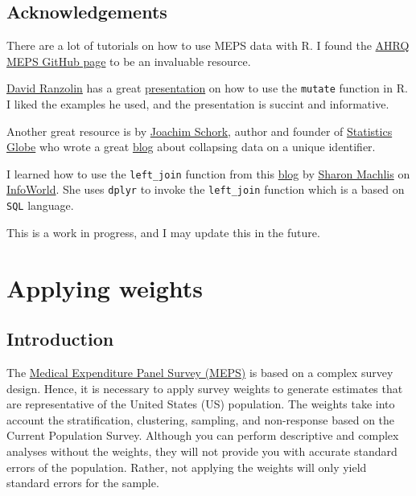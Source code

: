 \documentclass[
]{book}
\begin{document}
\hypertarget{acknowledgements-1}{%
\section{Acknowledgements}\label{acknowledgements-1}}

There are a lot of tutorials on how to use MEPS data with R. I found the \href{https://github.com/HHS-AHRQ/MEPS}{AHRQ MEPS GitHub page} to be an invaluable resource.

\href{https://daranzolin.github.io/}{David Ranzolin} has a great \href{https://rstudio-pubs-static.s3.amazonaws.com/116317_e6922e81e72e4e3f83995485ce686c14.html\#/2}{presentation} on how to use the \texttt{mutate} function in R. I liked the examples he used, and the presentation is succint and informative.

Another great resource is by \href{https://statisticsglobe.com/joachim-schork/}{Joachim Schork}, author and founder of \href{https://statisticsglobe.com/}{Statistics Globe} who wrote a great \href{https://statisticsglobe.com/sum-duplicate-rows-r}{blog} about collapsing data on a unique identifier.

I learned how to use the \texttt{left\_join} function from this \href{https://www.infoworld.com/article/3454356/how-to-merge-data-in-r-using-r-merge-dplyr-or-datatable.html}{blog} by \href{https://www.infoworld.com/author/Sharon-Machlis/}{Sharon Machlis} on \href{https://www.infoworld.com}{InfoWorld}. She uses \texttt{dplyr} to invoke the \texttt{left\_join} function which is a based on \texttt{SQL} language.

This is a work in progress, and I may update this in the future.

\hypertarget{weights}{%
\chapter{Applying weights}\label{weights}}

\hypertarget{introduction-2}{%
\section{Introduction}\label{introduction-2}}

The \href{https://www.meps.ahrq.gov/mepsweb/}{Medical Expenditure Panel Survey (MEPS)} is based on a complex survey design. Hence, it is necessary to apply survey weights to generate estimates that are representative of the United States (US) population. The weights take into account the stratification, clustering, sampling, and non-response based on the Current Population Survey. Although you can perform descriptive and complex analyses without the weights, they will not provide you with accurate standard errors of the population. Rather, not applying the weights will only yield standard errors for the sample.
\end{document}
